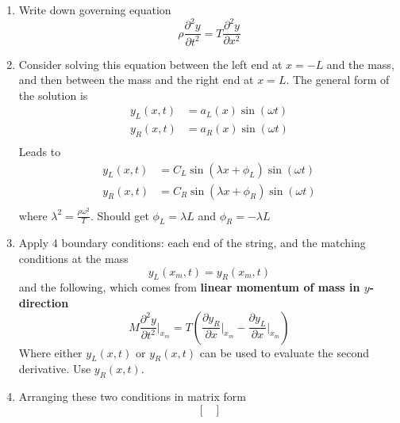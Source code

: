 \documentclass[letterpaper,twocolumn,notitlepage]{article}
\begin{document}
  \begin{enumerate}
    \item{Write down governing equation}
    \begin{equation*}
      \rho\frac{\partial^{2}y}{\partial t^{2}}=T\frac{\partial^{2}y}{\partial x^{2}}
    \end{equation*}
    \item{%
      Consider solving this equation between the left end at $x=-L$ and the mass, and then between the mass and the right end at $x=L$.
      The general form of the solution is
    }
    \begin{equation*}
      \begin{split}
        y_{L}(x,t)&=a_{L}(x)\sin(\omega t) \\
        y_{R}(x,t)&=a_{R}(x)\sin(\omega t) \\
      \end{split}
    \end{equation*}
    Leads to
    \begin{equation*}
      \begin{split}
        y_{L}(x,t)&=C_{L}\sin(\lambda x+\phi_{L})\sin(\omega t) \\
        y_{R}(x,t)&=C_{R}\sin(\lambda x+\phi_{R})\sin(\omega t) \\
      \end{split}
    \end{equation*}
    where $\lambda^{2}=\frac{\rho\omega^{2}}{T}$.
    Should get $\phi_{L}=\lambda L$ and $\phi_{R}=-\lambda L$
    \item{Apply 4 boundary conditions: each end of the string, and the matching conditions at the mass}
    \begin{equation*}
      \boxed{y_{L}(x_{m},t)=y_{R}(x_{m},t)}
    \end{equation*}
    and the following, which comes from \textbf{linear momentum of mass in $y$-direction}
    \begin{equation*}
      \boxed{M\frac{\partial^{2}y}{\partial t^{2}}\bigr|_{x_{m}}=T\left(\frac{\partial y_{R}}{\partial x}\bigr|_{x_{m}}-\frac{\partial y_{L}}{\partial x}\bigr|_{x_{m}}\right)}
    \end{equation*}
    Where either $y_{L}(x,t)$ or $y_{R}(x,t)$ can be used to evaluate the second derivative.
    Use $y_{R}(x,t)$.
    \item{Arranging these two conditions in matrix form}
    \begin{equation*}
      \begin{bmatrix}

\end{bmatrix}
\end{equation*}
\end{enumerate}
\end{document}
